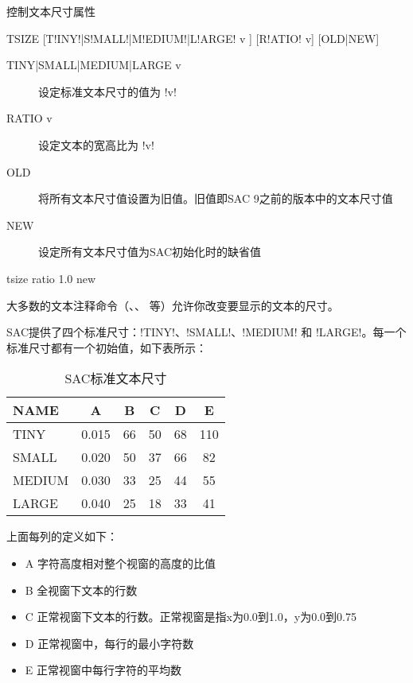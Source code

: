 \label{cmd:tsize}

控制文本尺寸属性

\begin{SACSTX}
TSIZE [T!INY!|S!MALL!|M!EDIUM!|L!ARGE! v ] [R!ATIO! v] [OLD|NEW]
\end{SACSTX}

\begin{description}
\item [TINY|SMALL|MEDIUM|LARGE v] 设定标准文本尺寸的值为 !v!
\item [RATIO v] 设定文本的宽高比为 !v!
\item [OLD] 将所有文本尺寸值设置为旧值。旧值即SAC 9之前的版本中的文本尺寸值
\item [NEW] 设定所有文本尺寸值为SAC初始化时的缺省值
\end{description}

\begin{SACDFT}
tsize ratio 1.0 new
\end{SACDFT}

大多数的文本注释命令（、、
等）允许你改变要显示的文本的尺寸。

SAC提供了四个标准尺寸：!TINY!、!SMALL!、!MEDIUM!
和 !LARGE!。每一个标准尺寸都有一个初始值，如下表所示：
\begin{table}[!ht]
\centering
\caption{SAC标准文本尺寸}
\begin{tabular}{lccccc}
\toprule
NAME	&	A	&	B	&	C	&	D	&	E	\\
\midrule
TINY 	& 0.015 &   66 	&  50  	&	68  &	110	\\
SMALL	& 0.020 &	50  &  37  	&	66  &	82	\\
MEDIUM  & 0.030 &	33  &  25  	&	44  &	55	\\
LARGE	& 0.040 &	25  &  18  	&	33  &	41	\\
\bottomrule
\end{tabular}
\end{table}

上面每列的定义如下：
\begin{itemize}
\item A 字符高度相对整个视窗的高度的比值
\item B 全视窗下文本的行数
\item C 正常视窗下文本的行数。正常视窗是指x为0.0到1.0，y为0.0到0.75
\item D 正常视窗中，每行的最小字符数
\item E 正常视窗中每行字符的平均数
\end{itemize}

